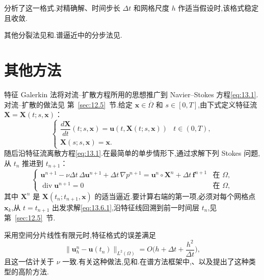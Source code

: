 分析了这一格式.对精确解、时间步长 \(\Delta t\) 和网格尺度 \(h\) 作适当假设时,该格式稳定且收敛.

其他分裂法见和.谱逼近中的分步法见.

\section{其他方法}\label{sec:13.6}

特征 Galerkin 法将对流--扩散方程所用的思想推广到 Navier--Stokes 方程\eqref{eq:13.1}.对流--扩散的做法见
第~\ref{sec:12.5}~节.给定 \(\boldsymbol{x}\in\overline\Omega\) 和 \(s\in[0,T]\),由下式定义特征流 \(\boldsymbol{X}=\boldsymbol{X}(t;s,\boldsymbol{x})\)：
\begin{equation}\label{eq:13.6.1}
  \begin{cases}
    \dfrac{d\boldsymbol{X}}{dt}(t;s,\boldsymbol{x})=\boldsymbol{u}(t,\boldsymbol{X}(t;s,\boldsymbol{x}))
       &t\in(0,T),\\[2pt]
    \boldsymbol{X}(s;s,\boldsymbol{x})=\boldsymbol{x}.
  \end{cases}
\end{equation}
随后沿特征流离散方程\eqref{eq:13.1}.在最简单的单步情形下,通过求解下列 Stokes 问题,从 \(t_n\) 推进到 \(t_{n+1}\)：
\begin{equation}\label{eq:13.6.2}
  \begin{cases}
    \boldsymbol{u}^{n+1}-\nu\Delta t\,\Delta\boldsymbol{u}^{n+1}+\Delta t\,\nabla p^{n+1}
        =\boldsymbol{u}^n\circ\boldsymbol{X}^n+\Delta t\,\boldsymbol{f}^{n+1}
         & \text{在 }\Omega,\\
    \operatorname{div}\boldsymbol{u}^{n+1}=0 & \text{在 }\Omega,
  \end{cases}
\end{equation}
其中 \(\boldsymbol{X}^n\) 是 \(\boldsymbol{X}(t_n;t_{n+1},\boldsymbol{x})\) 的适当逼近.要计算右端的第一项,必须对每个网格点 \(\boldsymbol{x}_k\),从 \(t=t_{n+1}\) 出发求解\eqref{eq:13.6.1},沿特征线回溯到前一时间层 \(t_n\),见第~\ref{sec:12.5}~节.

采用空间分片线性有限元时,特征格式的误差满足
\[
  \|\boldsymbol{u}_h^n-\boldsymbol{u}(t_n)\|_{L^2(\Omega)}
    =O\biggl(h+\Delta t+\frac{h^2}{\Delta t}\biggr),
\]
且这一估计关于 \(\nu\) 一致.有关这种做法,见和.在谱方法框架中,、以及提出了这种类型的高阶方法.

